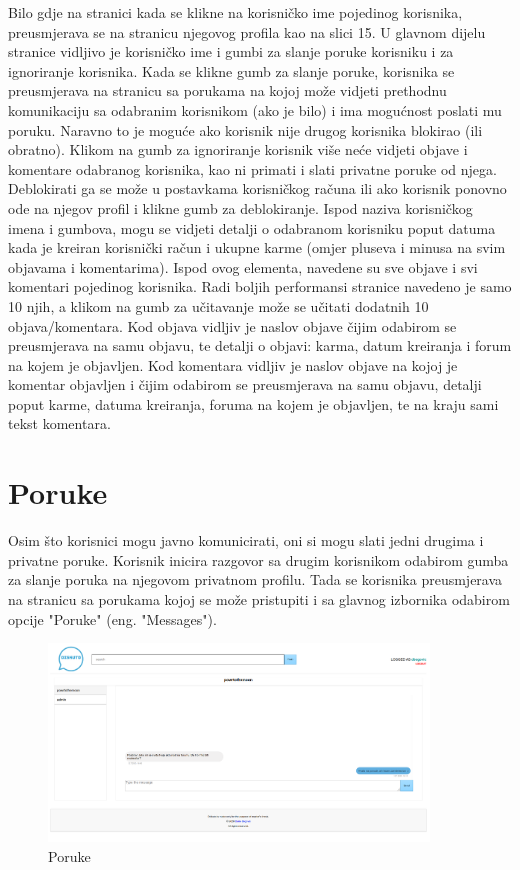 \documentclass{foi}
\begin{document}
Bilo gdje na stranici kada se klikne na korisničko ime pojedinog korisnika, preusmjerava se na stranicu njegovog profila kao na slici 15. U glavnom dijelu stranice vidljivo je korisničko ime i gumbi za slanje poruke korisniku i za ignoriranje korisnika. Kada se klikne gumb za slanje poruke, korisnika se preusmjerava na stranicu sa porukama na kojoj može vidjeti prethodnu komunikaciju sa odabranim korisnikom (ako je bilo) i ima mogućnost poslati mu poruku. Naravno to je moguće ako korisnik nije drugog korisnika blokirao (ili obratno). Klikom na gumb za ignoriranje korisnik više neće vidjeti objave i komentare odabranog korisnika, kao ni primati i slati privatne poruke od njega. Deblokirati ga se može u postavkama korisničkog računa ili ako korisnik ponovno ode na njegov profil i klikne gumb za deblokiranje. Ispod naziva korisničkog imena i gumbova, mogu se vidjeti detalji o odabranom korisniku poput datuma kada je kreiran korisnički račun i ukupne karme (omjer pluseva i minusa na svim objavama i komentarima). Ispod ovog elementa, navedene su sve objave i svi komentari pojedinog korisnika. Radi boljih performansi stranice navedeno je samo 10 njih, a klikom na gumb za učitavanje može se učitati dodatnih 10 objava/komentara. Kod objava vidljiv je naslov objave čijim odabirom se preusmjerava na samu objavu, te detalji o objavi: karma, datum kreiranja i forum na kojem je objavljen. Kod komentara vidljiv je naslov objave na kojoj je komentar objavljen i čijim odabirom se preusmjerava na samu objavu, detalji poput karme, datuma kreiranja, foruma na kojem je objavljen, te na kraju sami tekst komentara.

\section{Poruke}

Osim što korisnici mogu javno komunicirati, oni si mogu slati jedni drugima i privatne poruke. Korisnik inicira razgovor sa drugim korisnikom odabirom gumba za slanje poruka na njegovom privatnom profilu. Tada se korisnika preusmjerava na stranicu sa porukama kojoj se može pristupiti i sa glavnog izbornika odabirom opcije "Poruke" (eng. "Messages"). 

\begin{figure}[h!]
    \centering
    \includegraphics[width=0.9\textwidth]{slike/poruke.png}
    \caption{Poruke}
\end{figure}
\end{document}
